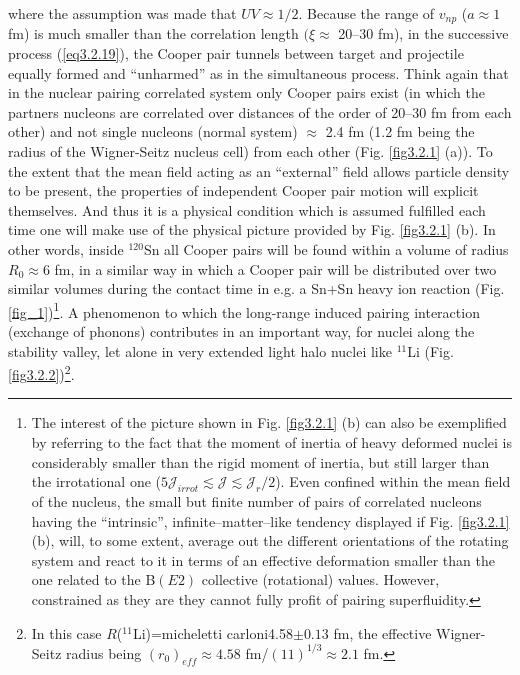 where the assumption was made that $UV\approx1/2$. Because the range of $v_{np}$ ($a\approx 1$ fm) is much smaller than the correlation length $(\xi\approx$ 20--30 fm), in the successive process (\ref{eq3.2.19}), the Cooper pair tunnels between target and projectile equally formed and ``unharmed'' as in the simultaneous process. Think again that in the nuclear pairing correlated system only Cooper pairs exist  (in which the partners nucleons are correlated over distances of the order of 20--30 fm from each other) and not single nucleons (normal system)  $\approx$ 2.4 fm (1.2 fm being the radius of the Wigner-Seitz nucleus cell) from each other (Fig. \ref{fig3.2.1} (a)). To the extent that the mean field acting as an ``external'' field allows particle density to be present, the properties of independent Cooper pair motion will explicit themselves. And thus it is a physical condition which is assumed fulfilled each time one will make use of the physical picture provided by Fig. \ref{fig3.2.1} (b). In other words, inside $^{120}$Sn all Cooper pairs will be found within a volume of radius $R_0\approx 6$ fm, in a similar way in which a Cooper pair will be distributed over two similar volumes during the contact time  in e.g. a Sn+Sn heavy ion reaction (Fig. \ref{fig_1})\footnote{The interest of the  picture shown in Fig. \ref{fig3.2.1} (b) can also be exemplified by referring to the fact that the moment of inertia of heavy deformed nuclei is considerably smaller than the rigid moment of inertia, but still larger than the irrotational one ($5\mathcal J_{irrot}\lesssim\mathcal J\lesssim  \mathcal J_r/2$). Even confined within the mean field of the nucleus, the small but finite number of pairs of correlated nucleons having the ``intrinsic'', infinite--matter--like tendency displayed if Fig. \ref{fig3.2.1} (b), will, to some extent, average out the different orientations of the rotating system and react to it in terms of an effective deformation smaller than the one related to the B$(E2)$ collective (rotational) values. However, constrained as they are they cannot fully profit of pairing superfluidity.}.  A phenomenon to which the long-range induced pairing interaction (exchange of phonons) contributes in an important way, for nuclei along the stability valley, let alone in very extended light halo nuclei like $^{11}$Li (Fig. \ref{fig3.2.2})\footnote{In this case $R$($^{11}$Li)=micheletti carloni4.58$\pm0.13$ fm, the effective Wigner-Seitz radius being $(r_0)_{eff}\approx 4.58$ fm/$(11)^{1/3}\approx2.1$ fm.}.

